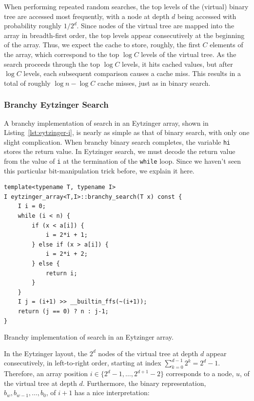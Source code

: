 \documentclass{patmorin}
\newcommand{\lstlabel}[1]{\label{lst:#1}}
\newcommand{\lstref}[1]{Listing~\ref{lst:#1}}
\begin{document}
When performing repeated random searches, the top levels of the (virtual)
binary tree are accessed most frequently, with a node at depth $d$
being accessed with probability roughly $1/2^d$.  Since nodes of the
virtual tree are mapped into the array in breadth-first order, the
top levels appear consecutively at the beginning of the array. Thus,
we expect the cache to store, roughly, the first $C$ elements of the
array, which correspond to the top $\log C$ levels of the virtual tree.
As the search proceeds through the top $\log C$ levels, it hits cached
values, but after $\log C$ levels, each subsequent comparison causes
a cache miss.  This results in a total of roughly $\log n-\log C$ cache
misses, just as in binary search.



\subsubsection{Branchy Eytzinger Search}

A branchy implementation of search in an Eytzinger array, shown in
\lstref{eytzinger-i}, is nearly as simple as that of binary search, with
only one slight complication. When branchy binary search completes, the
variable \texttt{hi} stores the return value. In Eytzinger search,
we must decode the return value from the value of \texttt{i}
at the termination of the \texttt{while} loop.  Since we haven't seen
this particular bit-manipulation trick before, we explain it here.


\begin{listing}
\begin{verbatim}
template<typename T, typename I>
I eytzinger_array<T,I>::branchy_search(T x) const {
    I i = 0;
    while (i < n) {
        if (x < a[i]) {
            i = 2*i + 1;
        } else if (x > a[i]) {
            i = 2*i + 2;
        } else {
            return i;
        }
    }
    I j = (i+1) >> __builtin_ffs(~(i+1));
    return (j == 0) ? n : j-1;
}
\end{verbatim}
\caption{Branchy implementation of search in an Eytzinger array.}
\lstlabel{eytzinger-i}
\end{listing}

In the Eytzinger layout, the $2^d$ nodes of the virtual tree at depth $d$
appear consecutively, in left-to-right order, starting at index
$\sum_{k=0}^{d-1}2^k = 2^d-1$.  Therefore, an array position
$i\in\{2^d-1,\ldots,2^{d+1}-2\}$ corresponds to a node, $u$, of the
virtual tree at depth $d$. Furthermore, the binary representation,
$b_w,b_{w-1},\ldots,b_0$, of $i+1$ has a nice interpretation:
\end{document}
